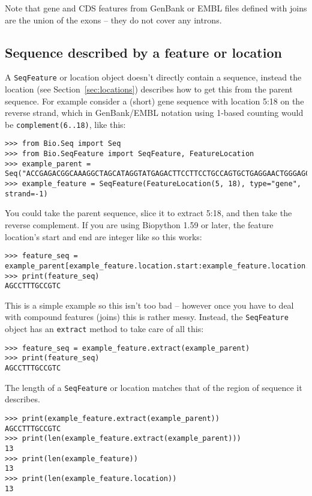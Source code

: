 Note that gene and CDS features from GenBank or EMBL files defined with joins
are the union of the exons -- they do not cover any introns.


\subsection{Sequence described by a feature or location}

A \verb|SeqFeature| or location object doesn't directly contain a sequence, instead the location (see Section~\ref{sec:locations}) describes how to get this from the parent sequence. For example consider a (short) gene sequence with location 5:18 on the reverse strand, which in GenBank/EMBL notation using 1-based counting would be \texttt{complement(6..18)}, like this:

\begin{verbatim}
>>> from Bio.Seq import Seq
>>> from Bio.SeqFeature import SeqFeature, FeatureLocation
>>> example_parent = Seq("ACCGAGACGGCAAAGGCTAGCATAGGTATGAGACTTCCTTCCTGCCAGTGCTGAGGAACTGGGAGCCTAC")
>>> example_feature = SeqFeature(FeatureLocation(5, 18), type="gene", strand=-1)
\end{verbatim}

You could take the parent sequence, slice it to extract 5:18, and then take the reverse complement.
If you are using Biopython 1.59 or later, the feature location's start and end are integer like so this works:

\begin{verbatim}
>>> feature_seq = example_parent[example_feature.location.start:example_feature.location.end].reverse_complement()
>>> print(feature_seq)
AGCCTTTGCCGTC
\end{verbatim}

This is a simple example so this isn't too bad -- however once you have to deal with compound features (joins) this is rather messy. Instead, the \verb|SeqFeature| object has an \verb|extract| method to take care of all this:

\begin{verbatim}
>>> feature_seq = example_feature.extract(example_parent)
>>> print(feature_seq)
AGCCTTTGCCGTC
\end{verbatim}

The length of a \verb|SeqFeature| or location matches
that of the region of sequence it describes.

\begin{verbatim}
>>> print(example_feature.extract(example_parent))
AGCCTTTGCCGTC
>>> print(len(example_feature.extract(example_parent)))
13
>>> print(len(example_feature))
13
>>> print(len(example_feature.location))
13
\end{verbatim}

